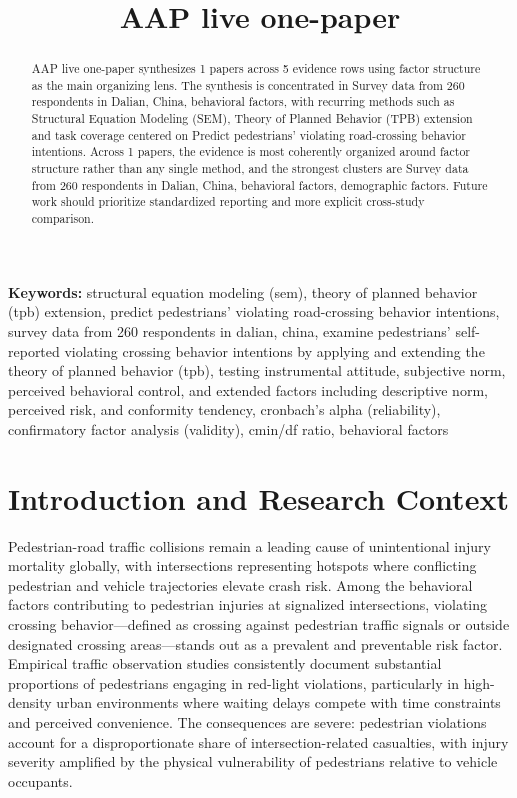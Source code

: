 \documentclass{article}
\title{AAP live one-paper}
\begin{document}
\maketitle
\begin{abstract}
AAP live one-paper synthesizes 1 papers across 5 evidence rows using factor structure as the main organizing lens. The synthesis is concentrated in Survey data from 260 respondents in Dalian, China, behavioral factors, with recurring methods such as Structural Equation Modeling (SEM), Theory of Planned Behavior (TPB) extension and task coverage centered on Predict pedestrians' violating road-crossing behavior intentions. Across 1 papers, the evidence is most coherently organized around factor structure rather than any single method, and the strongest clusters are Survey data from 260 respondents in Dalian, China, behavioral factors, demographic factors. Future work should prioritize standardized reporting and more explicit cross-study comparison.
\end{abstract}
\noindent\textbf{Keywords:} structural equation modeling (sem), theory of planned behavior (tpb) extension, predict pedestrians' violating road-crossing behavior intentions, survey data from 260 respondents in dalian, china, examine pedestrians' self-reported violating crossing behavior intentions by applying and extending the theory of planned behavior (tpb), testing instrumental attitude, subjective norm, perceived behavioral control, and extended factors including descriptive norm, perceived risk, and conformity tendency, cronbach's alpha (reliability), confirmatory factor analysis (validity), cmin/df ratio, behavioral factors
\section{Introduction and Research Context}
Pedestrian-road traffic collisions remain a leading cause of unintentional injury mortality globally, with intersections representing hotspots where conflicting pedestrian and vehicle trajectories elevate crash risk. Among the behavioral factors contributing to pedestrian injuries at signalized intersections, violating crossing behavior—defined as crossing against pedestrian traffic signals or outside designated crossing areas—stands out as a prevalent and preventable risk factor. Empirical traffic observation studies consistently document substantial proportions of pedestrians engaging in red-light violations, particularly in high-density urban environments where waiting delays compete with time constraints and perceived convenience. The consequences are severe: pedestrian violations account for a disproportionate share of intersection-related casualties, with injury severity amplified by the physical vulnerability of pedestrians relative to vehicle occupants. \cite{08_2016_zhou_aap}
\end{document}
